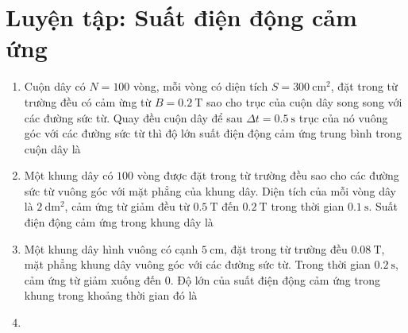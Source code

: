\chapter{Luyện tập: Suất điện động cảm ứng}
\begin{enumerate}
	\item
	{
		Cuộn dây có $N=100$ vòng, mỗi vòng có diện tích $S=\SI{300}{\centi \meter \squared}$, đặt trong từ trường đều có cảm ừng từ $B=\SI{0.2}{\tesla}$ sao cho trục của cuộn dây song song với các đường sức từ. Quay đều cuộn dây để sau $\Delta t= \SI{0.5}{\second}$ trục của nó vuông góc với các đường sức từ thì độ lớn suất điện động cảm ứng trung bình trong cuộn dây là
	}
	\item
	{
		Một khung dây có $100$ vòng được đặt trong từ trường đều sao cho các đường sức từ vuông góc với mặt phẳng của khung dây. Diện tích của mỗi vòng dây là $\SI{2}{\deci \meter \squared}$, cảm ứng từ giảm đều từ $\SI{0.5}{\tesla}$ đến $\SI{0.2}{\tesla}$ trong thời gian $\SI{0.1}{\second}$. Suất điện động cảm ứng trong khung dây là
	}
	\item
	{
		Một khung dây hình vuông có cạnh $\SI{5}{\centi \meter}$, đặt trong từ trường đều $\SI{0.08}{\tesla}$, mặt phẳng khung dây vuông góc với các đường sức từ. Trong thời gian $\SI{0.2}{\second}$, cảm ứng từ giảm xuống đến $0$. Độ lớn của suất điện động cảm ứng trong khung trong khoảng thời gian đó là
	}
	\item

\end{enumerate}
